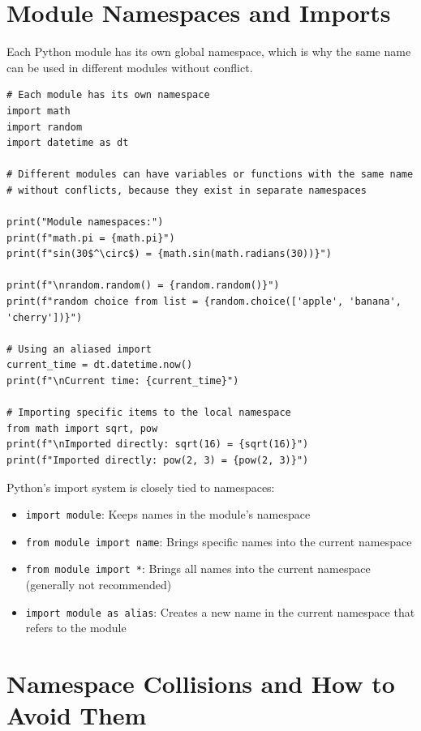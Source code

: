 \documentclass[12pt,letterpaper]{article}
\newenvironment{macterminal}{%
    \begin{mdframed}[
        linecolor=terminalFrame,
        backgroundcolor=terminalBg,
        roundcorner=5pt,
        skipabove=10pt,
        skipbelow=10pt,
        linewidth=1pt,
        innertopmargin=10pt, %
        frametitle={%
            \tikz[baseline=(current bounding box.east), outer sep=0pt]{
                \fill[red!80!black] (0,0) circle (5pt);
                \fill[yellow!80!black] (0.7,0) circle (5pt);
                \fill[green!70!black] (1.4,0) circle (5pt);
            }
        },
        frametitlealignment=\raggedright, %
        frametitleaboveskip=8pt, %
        frametitlebelowskip=0pt, %
    ]
}{%
    \end{mdframed}%
}
\begin{document}
\section{Module Namespaces and Imports}

Each Python module has its own global namespace, which is why the same name can be used in different modules without conflict.

\begin{macterminal}
\begin{lstlisting}
# Each module has its own namespace
import math
import random
import datetime as dt

# Different modules can have variables or functions with the same name
# without conflicts, because they exist in separate namespaces

print("Module namespaces:")
print(f"math.pi = {math.pi}")
print(f"sin(30$^\circ$) = {math.sin(math.radians(30))}")

print(f"\nrandom.random() = {random.random()}")
print(f"random choice from list = {random.choice(['apple', 'banana', 'cherry'])}")

# Using an aliased import
current_time = dt.datetime.now()
print(f"\nCurrent time: {current_time}")

# Importing specific items to the local namespace
from math import sqrt, pow
print(f"\nImported directly: sqrt(16) = {sqrt(16)}")
print(f"Imported directly: pow(2, 3) = {pow(2, 3)}")
\end{lstlisting}
\end{macterminal}

Python's import system is closely tied to namespaces:
\begin{itemize}
    \item \texttt{import module}: Keeps names in the module's namespace
    \item \texttt{from module import name}: Brings specific names into the current namespace
    \item \texttt{from module import *}: Brings all names into the current namespace (generally not recommended)
    \item \texttt{import module as alias}: Creates a new name in the current namespace that refers to the module
\end{itemize}

\section{Namespace Collisions and How to Avoid Them}
\end{document}
